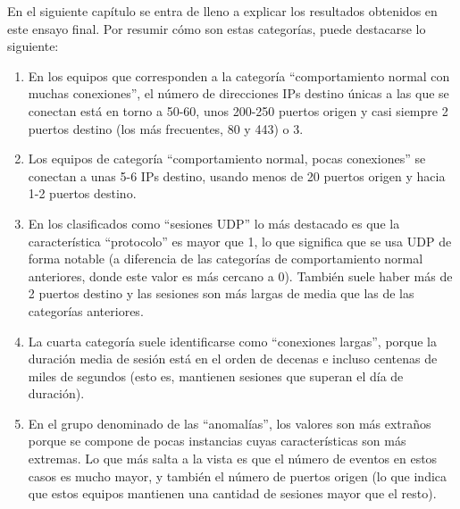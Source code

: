 En el siguiente capítulo se entra de lleno a explicar los resultados obtenidos en este ensayo final.
Por resumir cómo son estas categorías, puede destacarse lo siguiente:

\begin{enumerate}
    \item En los equipos que corresponden a la categoría ``comportamiento normal con muchas conexiones'', el número de direcciones IPs destino únicas a las que se conectan está en torno a 50-60, unos 200-250 puertos origen y casi siempre 2 puertos destino (los más frecuentes, 80 y 443) o 3.
    \item Los equipos de categoría ``comportamiento normal, pocas conexiones'' se conectan a unas 5-6 IPs destino, usando menos de 20 puertos origen y hacia 1-2 puertos destino.
    \item En los clasificados como ``sesiones UDP'' lo más destacado es que la característica ``protocolo'' es mayor que 1, lo que significa que se usa UDP de forma notable (a diferencia de las categorías de comportamiento normal anteriores, donde este valor es más cercano a 0). También suele haber más de 2 puertos destino y las sesiones son más largas de media que las de las categorías anteriores.
    \item La cuarta categoría suele identificarse como ``conexiones largas'', porque la duración media de sesión está en el orden de decenas e incluso centenas de miles de segundos (esto es, mantienen sesiones que superan el día de duración).
    \item En el grupo denominado de las ``anomalías'', los valores son más extraños porque se compone de pocas instancias cuyas características son más extremas. Lo que más salta a la vista es que el número de eventos en estos casos es mucho mayor, y también el número de puertos origen (lo que indica que estos equipos mantienen una cantidad de sesiones mayor que el resto).
\end{enumerate}
